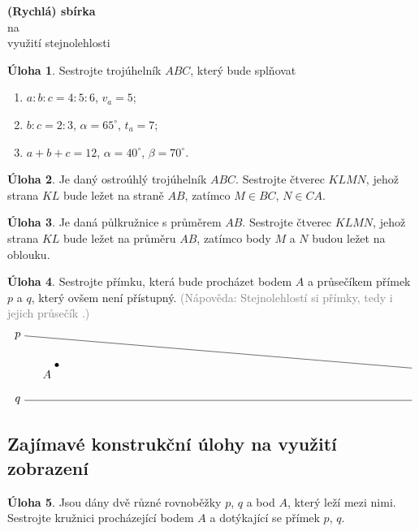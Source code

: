 \documentclass[10pt,a5paper]{extarticle}
\theoremstyle{definition}
\newtheorem{uloha}{Úloha}
\def\tisk{%
\newbox\shipouthackbox
\pdfpagewidth=2\pdfpagewidth
\let\oldshipout=\shipout
\def\shipout{\afterassignment\zdvojtmp \setbox\shipouthackbox=}%
\def\zdvojtmp{\aftergroup\zdvoj}%
\def\zdvoj{%
    \oldshipout\vbox{\hbox{%
        \copy\shipouthackbox
        \hskip\dimexpr .5\pdfpagewidth-\wd\shipouthackbox\relax
        \box\shipouthackbox
    }}%
}}%
\newcommand{\hint}[1]{{\footnotesize\textcolor{gray}{(Nápověda: #1)}}}
\begin{document}

\begin{center}
    \textbf{\LARGE (Rychlá) sbírka}\\[1mm]
    na\\[1mm]
    {\Large využití stejnolehlosti}
\end{center}


\begin{uloha}
Sestrojte trojúhelník $ABC$, který bude splňovat
\begin{enumerate}
    \item $a:b:c = 4:5:6$, $v_a = 5$;
    \item $b:c = 2:3$, $\alpha=65^\circ$, $t_a=7$;
    \item $a+b+c=12$, $\alpha=40^\circ$, $\beta=70^\circ$.
\end{enumerate}
\end{uloha}


\begin{uloha}
Je daný ostroúhlý trojúhelník $ABC$. Sestrojte čtverec $KLMN$, jehož strana $KL$ bude ležet na straně $AB$, zatímco $M \in BC$, $N \in CA$.
\end{uloha}

\begin{uloha}
Je daná půlkružnice s průměrem $AB$. Sestrojte čtverec $KLMN$, jehož strana $KL$ bude ležet na průměru $AB$, zatímco body $M$ a $N$ budou ležet na oblouku.
\end{uloha}

\begin{uloha}
Sestrojte přímku, která bude procházet bodem $A$ a průsečíkem přímek $p$ a $q$, který ovšem není přístupný. \hint{Stejnolehlostí si přímky, tedy i jejich průsečík \uv{přitáhněte}.}
\[\begin{tikzpicture}
\draw (0,0) node[left] {$q$} -- (12,0);
\draw (0,2) node[left] {$p$} -- (12,1);
\node[circle,fill=black,inner sep=1.25pt,label=below left:{$A$}] at (1,1.1) {};
\end{tikzpicture}\]
\end{uloha}


\subsection*{\llap{$\star$ }Zajímavé konstrukční úlohy na využití zobrazení}

\begin{uloha}
Jsou dány dvě různé rovnoběžky $p$, $q$ a bod $A$, který leží mezi nimi. Sestrojte kružnici procházející bodem $A$ a dotýkající se přímek $p$, $q$. %
\end{uloha}
\end{document}
